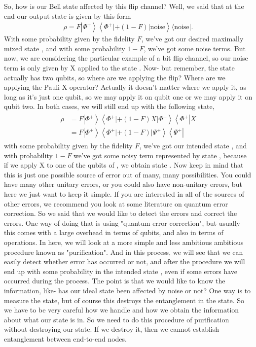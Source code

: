 So, how is our Bell state affected by this flip channel? Well, we said that at the end our output state is given by this form
\begin{align}
    \rho=F\left|\Phi^{+}\right\rangle\left\langle\Phi^{+}|+(1-F)| \text {noise}\right\rangle\langle\text{noise}|.
\end{align}
With some probability given by the fidelity $F$, we've got our desired maximally mixed state  \ket{\Phi^+}, and with some probability $1-F$, we've got some noise terms. But now, we are considering the particular example of a bit flip channel, so our noise term is only given by X applied to the state  \ket{\Phi^+}. Now- but remember, the state  \ket{\Phi^+} actually has two qubits, so where are we applying the flip? Where are we applying the Pauli X operator? Actually it doesn't matter where we apply it, as long as it's just one qubit, so we may apply it on qubit one or we may apply it on qubit two. In both cases, we will still end up with the following state,
\begin{align}
\begin{aligned}
\rho &=F\left|\Phi^{+}\right\rangle\left\langle\Phi^{+}|+(1-F) X| \Phi^{+}\right\rangle\left\langle\Phi^{+}\right| X \\
&=F\left|\Phi^{+}\right\rangle\left\langle\Phi^{+}|+(1-F)| \Psi^{+}\right\rangle\left\langle\Psi^{+}\right|
\end{aligned}
\end{align}
with some probability given by the fidelity $F$, we've got our intended state  \ket{\Phi^+}, and with probability $1-F$ we've got some noisy term represented by state \ket{\Psi^+}, because if we apply X to one of the qubits of  \ket{\Phi^+}, we obtain state \ket{\Psi^+}. Now keep in mind that this is just one possible source of error out of many, many possibilities. You could have many other unitary errors, or you could also have non-unitary errors, but here we just want to keep it simple. If you are interested in all of the sources of other errors, we recommend you look at some literature on quantum error correction. So we said that we would like to detect the errors and correct the errors. One way of doing that is using "quantum error correction", but usually this comes with a large overhead in terms of qubits, and also in terms of operations. In here, we will look at a more simple and less ambitious ambitious procedure known as "purification". And in this process, we will see that we can easily detect whether error has occurred or not, and after the procedure we will end up with some probability in the intended state  \ket{\Phi^+}, even if some errors have occurred during the process. The point is that we would like to know the information, like- has our ideal state been affected by noise or not? One way is to measure the state, but of course this destroys the entanglement in the state. So we have to be very careful how we handle and how we obtain the information about what our state is in. So we need to do this procedure of purification without destroying our state. If we destroy it, then we cannot establish entanglement between end-to-end nodes.

